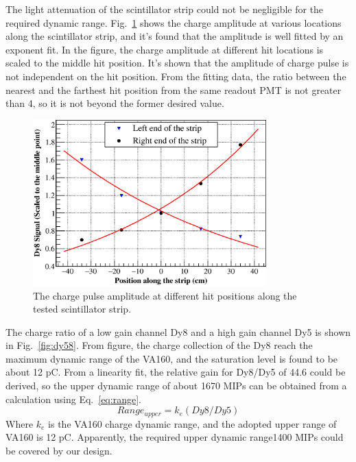 \documentclass[5p, times]{elsarticle}
\begin{document}
The light attenuation of the scintillator strip could not be negligible for the required dynamic range. Fig.~\ref{fig:attenuation} shows
the charge amplitude at various locations along the scintillator strip, and it’s found that the amplitude is well
fitted by an exponent fit. In the figure, the charge amplitude at different hit locations is scaled to the middle hit
position. It’s shown that the amplitude of charge pulse is not independent on the hit position. From the fitting data,
the ratio between the nearest and the farthest hit position from the same readout PMT is not greater than 4, so it is
not beyond the former desired value. 

\begin{figure}
 \centering
 \includegraphics[width=90mm]{attenuation}
\caption{The charge pulse amplitude at different hit positions along the tested scintillator strip.}
\label{fig:attenuation}
\end{figure} 

The charge ratio of a low gain channel Dy8 and a high gain channel Dy5 is shown in Fig.~\ref{fig:dy58}. From figure, the charge
collection of the Dy8 reach the maximum dynamic range of the VA160, and the saturation level is found to be about 12
pC. From a linearity fit, the relative gain for Dy8/Dy5 of 44.6 could be derived, so the upper dynamic range of about
1670 MIPs can be obtained from a calculation using Eq.~\ref{eq:range}.
\begin{equation}
 Range_{upper} = k_{e}(Dy8/Dy5)
 \label{eq:range}
\end{equation} 
Where $k_e$ is the VA160 charge dynamic range, and the adopted upper range of VA160 is 12
pC. Apparently, the required upper dynamic range1400 MIPs could be covered by our design.
\end{document}
